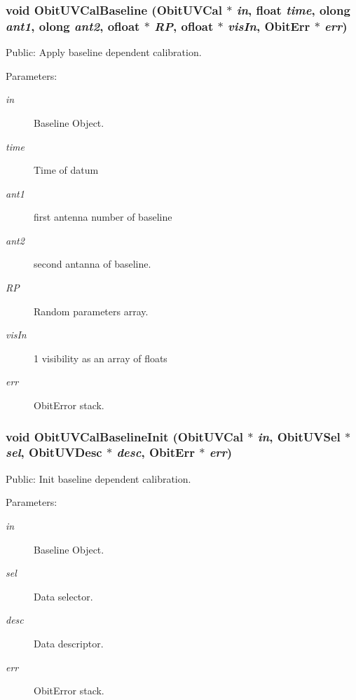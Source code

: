\subsubsection{\setlength{\rightskip}{0pt plus 5cm}void Obit\-UVCal\-Baseline ({\bf Obit\-UVCal} $\ast$ {\em in}, float {\em time}, {\bf olong} {\em ant1}, {\bf olong} {\em ant2}, {\bf ofloat} $\ast$ {\em RP}, {\bf ofloat} $\ast$ {\em vis\-In}, {\bf Obit\-Err} $\ast$ {\em err})}\label{ObitUVCalBaseline_8c_a4}


Public: Apply baseline dependent calibration. 

\begin{Desc}
\item[Parameters:]
\begin{description}
\item[{\em in}]Baseline Object. \item[{\em time}]Time of datum \item[{\em ant1}]first antenna number of baseline \item[{\em ant2}]second antanna of baseline. \item[{\em RP}]Random parameters array. \item[{\em vis\-In}]1 visibility as an array of floats \item[{\em err}]Obit\-Error stack. \end{description}
\end{Desc}
\subsubsection{\setlength{\rightskip}{0pt plus 5cm}void Obit\-UVCal\-Baseline\-Init ({\bf Obit\-UVCal} $\ast$ {\em in}, {\bf Obit\-UVSel} $\ast$ {\em sel}, {\bf Obit\-UVDesc} $\ast$ {\em desc}, {\bf Obit\-Err} $\ast$ {\em err})}\label{ObitUVCalBaseline_8c_a3}


Public: Init baseline dependent calibration. 

\begin{Desc}
\item[Parameters:]
\begin{description}
\item[{\em in}]Baseline Object. \item[{\em sel}]Data selector. \item[{\em desc}]Data descriptor. \item[{\em err}]Obit\-Error stack. \end{description}
\end{Desc}
